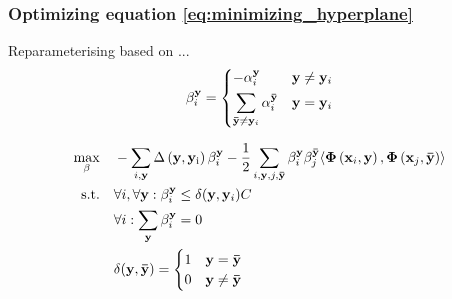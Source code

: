\begin{frame}
    \frametitle{Optimizing equation \eqref{eq:minimizing_hyperplane}}
    Reparameterising based on ...
    \begin{equation}
        \beta_i^\mathbf{y} = \begin{dcases}
                                -\alpha_i^\mathbf{y} & \mathbf{y} \ne \mathbf{y}_i \\
                                \sum_{\mathbf{\bar{y}} \ne \mathbf{y}_i} \alpha_i^\mathbf{\bar{y}} & \mathbf{y} = \mathbf{y}_i
                             \end{dcases}
    \end{equation}

    \begin{equation}
        \begin{aligned}
            \max_{\beta} \quad & -\sum_{i,\mathbf{y}} \operatorname{\Delta \left( \mathbf{y}, \mathbf{y}_i \right)} \beta_i^\mathbf{y} -
                \frac{1}{2} \sum_{i,\mathbf{y},j,\mathbf{\bar{y}}} \beta_i^\mathbf{y}
                \beta_j^\mathbf{\bar{y}} \langle \mathbf{\Phi}\left( \mathbf{x}_i, \mathbf{y}
                \right), \mathbf{\Phi}\left( \mathbf{x}_j, \mathbf{\bar{y}} \right) \rangle \\
            \operatorname{\text{s.t.} \quad} & \forall i, \forall \mathbf{y} : \beta_i^\mathbf{y} \le \delta(\mathbf{y}, \mathbf{y}_i) C \\
                & \forall i: \sum_\mathbf{y} \beta_i^\mathbf{y} = 0 \\
                & \delta(\mathbf{y}, \mathbf{\bar{y}}) = \begin{cases}
                                                    1 & \mathbf{y} = \mathbf{\bar{y}} \\
                                                    0 & \mathbf{y} \ne \mathbf{\bar{y}}
                                               \end{cases} \nonumber \\
        \end{aligned}
    \end{equation}
\end{frame}


